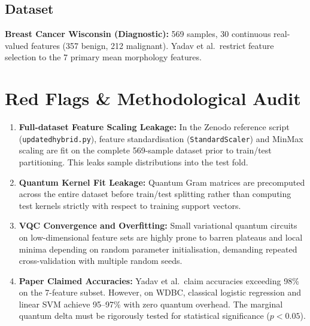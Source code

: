 \documentclass[12pt,a4paper]{article}
\begin{document}
\subsection{Dataset}
\textbf{Breast Cancer Wisconsin (Diagnostic):} 569 samples, 30 continuous real-valued features (357 benign, 212 malignant). Yadav et al.\ restrict feature selection to the 7 primary mean morphology features.

\section{Red Flags \& Methodological Audit}
\begin{enumerate}[leftmargin=*]
  \item \textbf{Full-dataset Feature Scaling Leakage:} In the Zenodo reference script (\texttt{updatedhybrid.py}), feature standardisation (\texttt{StandardScaler}) and MinMax scaling are fit on the complete 569-sample dataset prior to train/test partitioning. This leaks sample distributions into the test fold.
  \item \textbf{Quantum Kernel Fit Leakage:} Quantum Gram matrices are precomputed across the entire dataset before train/test splitting rather than computing test kernels strictly with respect to training support vectors.
  \item \textbf{VQC Convergence and Overfitting:} Small variational quantum circuits on low-dimensional feature sets are highly prone to barren plateaus and local minima depending on random parameter initialisation, demanding repeated cross-validation with multiple random seeds.
  \item \textbf{Paper Claimed Accuracies:} Yadav et al.\ claim accuracies exceeding 98\% on the 7-feature subset. However, on WDBC, classical logistic regression and linear SVM achieve 95--97\% with zero quantum overhead. The marginal quantum delta must be rigorously tested for statistical significance ($p < 0.05$).
\end{enumerate}

\end{document}

